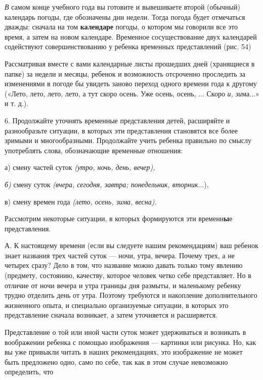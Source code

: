 \documentclass{book}
\renewcommand{\emph}[1]{\textit{#1}}
\begin{document}
\emph{В} самом конце учебного года вы готовите и вывешиваете второй
(обычный) календарь погоды, где обозначены дни недели. Тогда погода
будет отмечаться дважды: сначала на том \textbf{календаре} погоды, о
котором мы говорили все это время, а затем на новом календаре. Временное
сосуществование двух календарей содействуют совершенствованию у ребенка
временных представлений (рис. 54)

Рассматривая вместе с вами календарные листы прошедших дней (хранящиеся
в папке) за недели и месяцы, ребенок и возможность отсроченно проследить
за изменениями в погоде бы увидеть заново переход одного времени года к
другому («Лето, лето, лето, лето, а тут скоро осень. Уже осень, осень,
... Скоро \emph{и, зи}ма...» и т. д.).

6. Продолжайте уточнять временные представления детей, расширяйте и
разнообразьте ситуации, в которых эти представления становятся все более
зримыми и многообразными. Продолжайте учить ребенка правильно по смыслу
употреблять слова, обозначающие временные отношения:

а) смену частей суток \emph{(утро, ночь, день, вечер),}

\emph{б)} смену суток \emph{(вчера, сегодня, завтра; понедельник,
вторник}...),

в) смену времен года \emph{(лето, осень, зима, весна).}

Рассмотрим некоторые ситуации, в которых формируются эти
временн\textbf{ы}е представления.

А. К настоящему времени (если вы следуете нашим рекомендациям) ваш
ребенок знает названия трех частей суток --- ночи, утра, вечера. Почему
трех, а не четырех сразу? Дело в том, что название можно давать только
тому явлению (предмету, состоянию, качеству, которое человек четко себе
представляет. Но в отличие от ночи вечера и утра границы дня размыты, и
маленькому ребенку трудно отделить день от утра. Поэтому требуются и
накопление дополнительного жизненного опыта, и специально организуемые
ситуации, в которых это представление сначала возникает, а затем
уточняется и расширяется.

Представление о той или иной части суток может удерживаться и возникать
в воображении ребенка с помощью изображения --- картинки или рисунка.
Но, как вы уже привыкли читать в наших рекомендациях, это изображение не
может быть предложено одно, само по себе, так как в этом случае
невозможно определить, что
\end{document}
